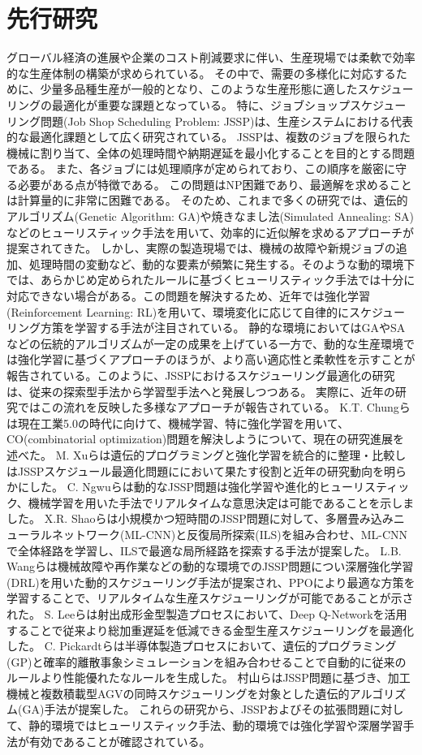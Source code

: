 \documentclass{jarticle}
\begin{document}
\section{先行研究}
グローバル経済の進展や企業のコスト削減要求に伴い、生産現場では柔軟で効率的な生産体制の構築が求められている。
その中で、需要の多様化に対応するために、少量多品種生産が一般的となり、このような生産形態に適したスケジューリングの最適化が重要な課題となっている。
特に、ジョブショップスケジューリング問題(Job Shop Scheduling Problem: JSSP)は、生産システムにおける代表的な最適化課題として広く研究されている。
JSSPは、複数のジョブを限られた機械に割り当て、全体の処理時間や納期遅延を最小化することを目的とする問題である。
また、各ジョブには処理順序が定められており、この順序を厳密に守る必要がある点が特徴である。
この問題はNP困難であり、最適解を求めることは計算量的に非常に困難である。
そのため、これまで多くの研究では、遺伝的アルゴリズム(Genetic Algorithm: GA)や焼きなまし法(Simulated Annealing: SA)などのヒューリスティック手法を用いて、効率的に近似解を求めるアプローチが提案されてきた。
しかし、実際の製造現場では、機械の故障や新規ジョブの追加、処理時間の変動など、動的な要素が頻繁に発生する。そのような動的環境下では、あらかじめ定められたルールに基づくヒューリスティック手法では十分に対応できない場合がある。この問題を解決するため、近年では強化学習(Reinforcement Learning: RL)を用いて、環境変化に応じて自律的にスケジューリング方策を学習する手法が注目されている。
静的な環境においてはGAやSAなどの伝統的アルゴリズムが一定の成果を上げている一方で、動的な生産環境では強化学習に基づくアプローチのほうが、より高い適応性と柔軟性を示すことが報告されている。このように、JSSPにおけるスケジューリング最適化の研究は、従来の探索型手法から学習型手法へと発展しつつある。
実際に、近年の研究ではこの流れを反映した多様なアプローチが報告されている。
K.T. Chungら\cite{ref1}は現在工業5.0の時代に向けて、機械学習、特に強化学習を用いて、CO(combinatorial optimization)問題を解決しようについて、現在の研究進展を述べた。
M. Xuら\cite{ref2}は遺伝的プログラミングと強化学習を統合的に整理・比較しはJSSPスケジュール最適化問題ににおいて果たす役割と近年の研究動向を明らかにした。
C. Ngwuら\cite{ref3}は動的なJSSP問題は強化学習や進化的ヒューリスティック、機械学習を用いた手法でリアルタイムな意思決定は可能であることを示しました。
X.R. Shaoら\cite{ref4}は小規模かつ短時間のJSSP問題に対して、多層畳み込みニューラルネットワーク(ML-CNN)と反復局所探索(ILS)を組み合わせ、ML-CNNで全体経路を学習し、ILSで最適な局所経路を探索する手法が提案した。
L.B. Wangら\cite{ref5}は機械故障や再作業などの動的な環境でのJSSP問題につい深層強化学習(DRL)を用いた動的スケジューリング手法が提案され、PPOにより最適な方策を学習することで、リアルタイムな生産スケジューリングが可能であることが示された。
S. Leeら\cite{ref6}は射出成形金型製造プロセスにおいて、Deep Q-Networkを活用することで従来より総加重遅延を低減できる金型生産スケジューリングを最適化した。
C. Pickardtら\cite{ref7}は半導体製造プロセスにおいて、遺伝的プログラミング(GP)と確率的離散事象シミュレーションを組み合わせることで自動的に従来のルールより性能優れたなルールを生成した。
村山ら\cite{ref8}はJSSP問題に基づき、加工機械と複数積載型AGVの同時スケジューリングを対象とした遺伝的アルゴリズム(GA)手法が提案した。
これらの研究から、JSSPおよびその拡張問題に対して、静的環境ではヒューリスティック手法、動的環境では強化学習や深層学習手法が有効であることが確認されている。
\end{document}
